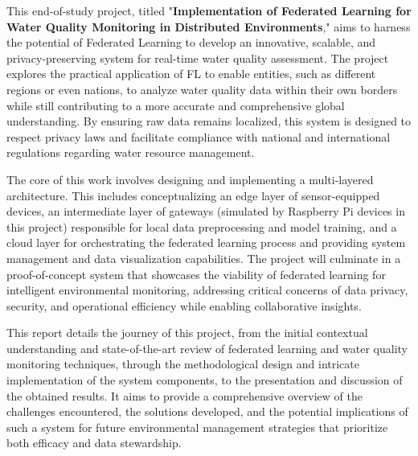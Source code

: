This end-of-study project, titled "\textbf{Implementation of Federated Learning for Water Quality Monitoring in Distributed Environments}," aims to harness the potential of Federated Learning to develop an innovative, scalable, and privacy-preserving system for real-time water quality assessment. The project explores the practical application of FL to enable entities, such as different regions or even nations, to analyze water quality data within their own borders while still contributing to a more accurate and comprehensive global understanding. By ensuring raw data remains localized, this system is designed to respect privacy laws and facilitate compliance with national and international regulations regarding water resource management.

The core of this work involves designing and implementing a multi-layered architecture. This includes conceptualizing an edge layer of sensor-equipped devices, an intermediate layer of gateways (simulated by Raspberry Pi devices in this project) responsible for local data preprocessing and model training, and a cloud layer for orchestrating the federated learning process and providing system management and data visualization capabilities. The project will culminate in a proof-of-concept system that showcases the viability of federated learning for intelligent environmental monitoring, addressing critical concerns of data privacy, security, and operational efficiency while enabling collaborative insights.

This report details the journey of this project, from the initial contextual understanding and state-of-the-art review of federated learning and water quality monitoring techniques, through the methodological design and intricate implementation of the system components, to the presentation and discussion of the obtained results. It aims to provide a comprehensive overview of the challenges encountered, the solutions developed, and the potential implications of such a system for future environmental management strategies that prioritize both efficacy and data stewardship.

 